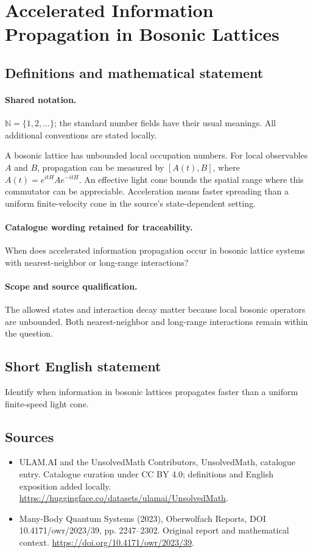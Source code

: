 \documentclass[11pt]{article}
\begin{document}
\section{Accelerated Information Propagation in Bosonic Lattices}\label{statement}

\subsection{Definitions and mathematical statement}

\paragraph{Shared notation.}$\mathbb N=\{1,2,\ldots\}$; the standard number fields have their usual meanings. All additional conventions are stated locally.


A bosonic lattice has unbounded local occupation numbers. For local observables $A$ and $B$, propagation can be measured by $[A(t),B]$, where $A(t)=e^{itH}Ae^{-itH}$. An effective light cone bounds the spatial range where this commutator can be appreciable. Acceleration means faster spreading than a uniform finite-velocity cone in the source's state-dependent setting.

\paragraph{Catalogue wording retained for traceability.}
When does accelerated information propagation occur in bosonic lattice systems with nearest-neighbor or long-range interactions?

\paragraph{Scope and source qualification.}The allowed states and interaction decay matter because local bosonic operators are unbounded. Both nearest-neighbor and long-range interactions remain within the question.
\subsection{Short English statement}
Identify when information in bosonic lattices propagates faster than a uniform finite-speed light cone.
\subsection{Sources}
\begin{itemize}
\item[\hypertarget{source:statement:1}{S1}] ULAM.AI and the UnsolvedMath Contributors, UnsolvedMath, catalogue entry. Catalogue curation under CC BY 4.0; definitions and English exposition added locally.
\url{https://huggingface.co/datasets/ulamai/UnsolvedMath}.
\item[\hypertarget{source:statement:2}{S2}] Many-Body Quantum Systems (2023), Oberwolfach Reports, DOI 10.4171/owr/2023/39, pp. 2247--2302. Original report and mathematical context.
\url{https://doi.org/10.4171/owr/2023/39}.
\end{itemize}
\label{end:statement}
\end{document}
